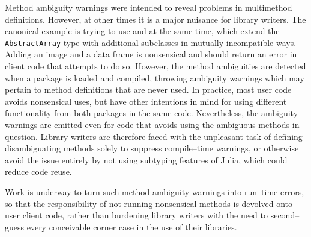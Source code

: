 \documentclass[pldi]{sigplanconf-pldi15}
\begin{document}
Method ambiguity warnings were intended to reveal problems in multimethod
definitions. However, at other times it is a major nuisance for library
writers. The canonical example is trying to use  and
 at the same time, which extend the \verb|AbstractArray|
type with additional subclasses in mutually incompatible ways. Adding an image
and a data frame is nonsensical and should return an error in client code that
attempts to do so. However, the method ambiguities are detected when a package
is loaded and compiled, throwing ambiguity warnings which may pertain to method
definitions that are never used. In practice, most user code avoids nonsensical
uses, but have other intentions in mind for using different functionality from
both packages in the same code. Nevertheless, the ambiguity warnings are
emitted even for code that avoids using the ambiguous methods in question.
Library writers are therefore faced with the unpleasant task of defining
disambiguating methods solely to suppress compile--time warnings, or otherwise
avoid the issue entirely by not using subtyping features of Julia, which could
reduce code reuse.

Work is underway to turn such method ambiguity warnings into run--time errors,
so that the responsibility of not running nonsensical methods is devolved onto
user client code, rather than burdening library writers with the need to
second--guess every conceivable corner case in the use of their libraries.







\end{document}

